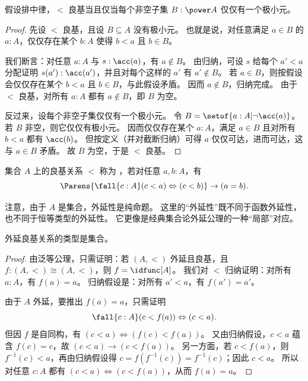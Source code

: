 \begin{lem}\label{thm:wfmin}
  假设排中律，$<$ 良基当且仅当每个非空子集 $B: \power A$ 仅仅有一个极小元。
\end{lem}
\begin{proof}
  先设 $<$ 良基，且设 $B\subseteq A$ 没有极小元。
  也就是说，对任意满足 $a\in B$ 的 $a:A$，仅仅存在某个 $b:A$ 使得 $b<a$ 且 $b\in B$。

  我们断言：对任意 $a:A$ 与 $s:\acc(a)$，有 $a\notin B$。
  由归纳，可设 $s$ 给每个 $a'<a$ 分配证明 $s(a'):\acc(a')$，并且对每个这样的 $a'$ 有 $a'\notin B$。
  若 $a\in B$，则按假设会仅仅存在某个 $b<a$ 且 $b\in B$，与此假设矛盾。
  因而 $a\notin B$，归纳完成。
  由于 $<$ 良基，对所有 $a:A$ 都有 $a\notin B$，即 $B$ 为空。

  反过来，设每个非空子集仅仅有一个极小元。
  令 $B = \setof{ a:A | \neg \acc(a) }$。
  若 $B$ 非空，则它仅仅有极小元。
  因而仅仅存在某个 $a:A$，满足 $a\in B$ 且对所有 $b<a$ 都有 $\acc(b)$。
  但按定义（并对截断归纳）可得 $a$ 仅仅可达，进而可达，这与 $a\in B$ 矛盾。
  故 $B$ 为空，于是 $<$ 良基。
\end{proof}

\begin{defn}
  集合 $A$ 上的良基关系 $<$ 称为
  ，若对任意 $a,b:A$，有
  \[ \Parens{\fall{c:A} (c<a) \Leftrightarrow (c<b)} \to (a=b). \]
\end{defn}

注意，由于 $A$ 是集合，外延性是纯命题。
这里的“外延性”既不同于函数外延性，也不同于恒等类型的外延性。
%
它更像是经典集合论外延公理的一种“局部”对应。

\begin{thm}
  外延良基关系的类型是集合。
\end{thm}
\begin{proof}
  由泛等公理，只需证明：若 $(A,<)$ 外延且良基，且 $f:(A,<) \cong (A,<)$，则 $f=\idfunc[A]$。
  我们对 $<$ 归纳证明：对所有 $a:A$，有 $f(a)=a$。
  归纳假设是：对所有 $a'<a$，有 $f(a')=a'$。

  由于 $A$ 外延，要推出 $f(a)=a$，只需证明
  \[\fall{c:A}(c<f(a)) \Leftrightarrow (c<a).\]
  但因 $f$ 是自同构，有 $(c<a) \Leftrightarrow (f(c)<f(a))$。
  又由归纳假设，$c<a$ 蕴含 $f(c)=c$，故 $(c<a) \to (c<f(a))$。
  另一方面，若 $c<f(a)$，则 $f^{-1}(c)<a$，再由归纳假设得 $c = f(f^{-1}(c)) = f^{-1}(c)$；因此 $c<a$。
  所以对任意 $c:A$ 都有 $(c<a) \Leftrightarrow (c<f(a))$，从而 $f(a)=a$。
\end{proof}

